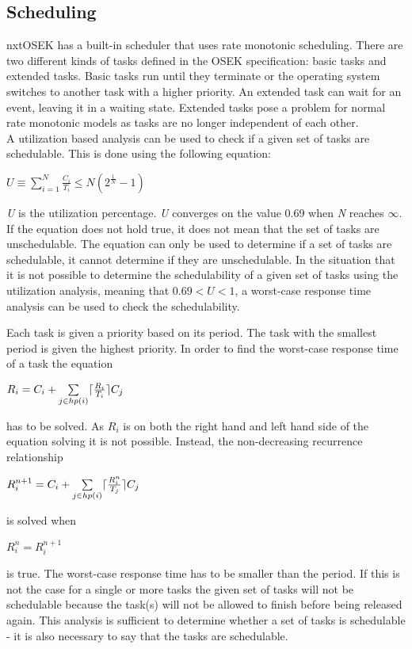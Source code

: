 \subsection{Scheduling}\label{sec:scheduling}



nxtOSEK has a built-in scheduler that uses rate monotonic scheduling. There are two different kinds of tasks defined in the OSEK specification: basic tasks and extended tasks. Basic tasks run until they terminate or the operating system switches to another task with a higher priority. An extended task can wait for an event, leaving it in a waiting state. Extended tasks pose a problem for normal rate monotonic models as tasks are no longer independent of each other.\\

A utilization based analysis can be used to check if a given set of tasks are schedulable. This is done using the following equation: \\ \begin{center}$U \equiv \sum\limits_{i=1}^N \frac{C_i}{T_i} \leq N(2^\frac{1}{N} - 1)$ \end{center}
\textit{U} is the utilization percentage. \textit{U} converges on the value 0.69 when \textit{N} reaches $\infty$. If the equation does not hold true, it does not mean that the set of tasks are unschedulable. The equation can only be used to determine if a set of tasks are schedulable, it cannot determine if they are unschedulable. In the situation that it is not possible to determine the schedulability of a given set of tasks using the utilization analysis, meaning that $0.69 < U < 1$, a worst-case response time analysis can be used to check the schedulability.

Each task is given a priority based on its period. The task with the smallest period is given the highest priority. In order to find the worst-case response time of a task the equation \\
\begin{center}$R_i = C_i + \sum\limits_{j\in{}hp(i)} \lceil\frac{R_i}{T_i}\rceil C_j$\end{center}
has to be solved. As $R_i$ is on both the right hand and left hand side of the equation solving it is not possible. Instead, the non-decreasing recurrence relationship \\ 
\begin{center}$R_i^{n+1} = C_i + \sum\limits_{j\in{}hp(i)} \lceil\frac{R_i^n}{T_j}\rceil C_j$\end{center}
is solved when \\ 
\begin{center}$R_i^n = R_i^{n+1}$\end{center}
is true. The worst-case response time has to be smaller than the period. If this is not the case for a single or more tasks the given set of tasks will not be schedulable because the task(s) will not be allowed to finish before being released again. This analysis is sufficient to determine whether a set of tasks is schedulable - it is also necessary to say that the tasks are schedulable. \\ 

